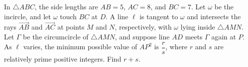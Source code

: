 In \(\triangle ABC\), the side lengths are \(AB=5\), \(AC=8\), and \(BC=7\). Let \(\omega\) be the incircle, and let \(\omega\) touch \(BC\) at \(D\). A line \(\ell\) is tangent to \(\omega\) and intersects the rays \(\overrightarrow{AB}\) and \(\overrightarrow{AC}\) at points \(M\) and \(N\), respectively, with \(\omega\) lying inside \(\triangle AMN\). Let \(\Gamma\) be the circumcircle of \(\triangle AMN\), and suppose line \(AD\) meets \(\Gamma\) again at \(P\). As \(\ell\) varies, the minimum possible value of \(AP^2\) is \(\dfrac{r}{s}\), where \(r\) and \(s\) are relatively prime positive integers. Find \(r+s\).
